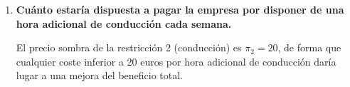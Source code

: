 \begin{enumerate}
    Si el tiempo de conducción de la zona A se redujera por debajo de las 2.5 horas interesaría distribuir en esta zona.   

    \item \textbf{Cuánto estaría dispuesta a pagar la empresa por disponer de una hora adicional de conducción cada semana.}

    El precio sombra de la restricción 2 (conducción) es $\pi_2 = 20$, de forma que cualquier coste inferior a 20 euros por hora adicional de conducción daría lugar a una mejora del beneficio total.





\end{enumerate}
